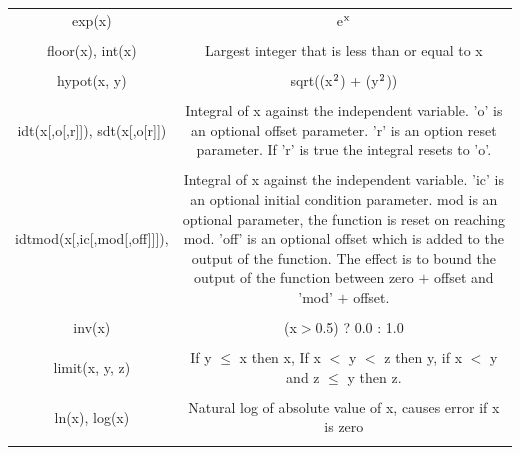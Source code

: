 \begin{longtable}{c c}
exp(x) & \begin{minipage}{20em}
e$\rm{^x}$
\end{minipage}\\ \\

floor(x), int(x) & \begin{minipage}{20em}
Largest integer that is less than or equal to x
\end{minipage}\\ \\

hypot(x, y) & \begin{minipage}{20em}
sqrt((x$\rm{^2}$) + (y$\rm{^2}$))
\end{minipage}\\ \\

idt(x[,o[,r]]), sdt(x[,o[r]]) & \begin{minipage}{20em}
Integral of x against the independent variable. 'o' is an optional offset parameter. 'r' is an option reset parameter. If 'r' is true the integral resets to 'o'.
\end{minipage}\\ \\

idtmod(x[,ic[,mod[,off]]]), & \begin{minipage}{20em}
Integral of x against the independent variable. 'ic' is an optional initial condition parameter. mod is an optional parameter, the function is reset on reaching mod. 'off' is an optional offset which is added to the output of the function. The effect is to bound the output of the function between zero $+$ offset and 'mod' $+$ offset.
\end{minipage}\\ \\

inv(x) & \begin{minipage}{20em}
(x$>$0.5) ? 0.0 : 1.0
\end{minipage}\\ \\

limit(x, y, z) & \begin{minipage}{20em}
If y $\leq$ x then x, If x $<$ y $<$ z then y, if x $<$ y and z $\leq$ y then z.  
\end{minipage}\\ \\

ln(x), log(x) & \begin{minipage}{20em}
Natural log of absolute value of x, causes error if x is zero
\end{minipage}\\ \\


\end{longtable}
